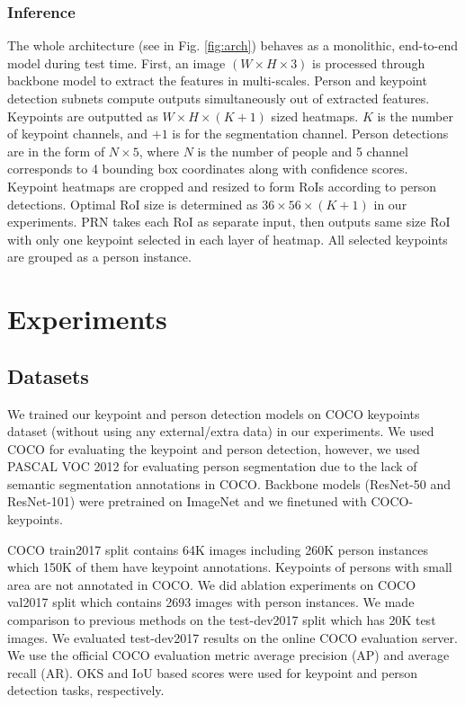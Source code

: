 \documentclass[runningheads]{llncs}
\begin{document}
\subsubsection{Inference}
The whole architecture (see in Fig. \ref{fig:arch}) behaves as  a monolithic, end-to-end model during test time. First, an image $(W \times H \times 3)$ is processed through backbone model to extract the features in multi-scales. Person and keypoint detection subnets compute outputs simultaneously out of extracted features. Keypoints are outputted as $W \times H \times (K+1)$ sized heatmaps. $K$ is the number of keypoint channels, and $+1$ is for the segmentation channel. Person detections are in the form of $N \times 5$, where $N$ is the number of people and 5 channel corresponds to 4 bounding box coordinates along with confidence scores. Keypoint heatmaps are cropped and resized to form RoIs according to person detections. Optimal RoI size is determined as $36 \times 56 \times (K+1)$ in our experiments. PRN takes each RoI as separate input, then outputs same size RoI with only one keypoint selected in each layer of heatmap. All selected keypoints are grouped as a person instance.




\section{Experiments}
\subsection{Datasets}
We trained our keypoint and person detection models on COCO keypoints dataset \cite{Lin2014} (without using any external/extra data) in our experiments. We used COCO for evaluating the keypoint and person detection, however, we used PASCAL VOC 2012\cite{Everingham15} for evaluating person segmentation due to the lack of semantic segmentation annotations in COCO. Backbone models (ResNet-50 and ResNet-101) were pretrained on ImageNet and we finetuned with COCO-keypoints.


COCO train2017 split contains 64K images including 260K person instances which 150K of them have keypoint annotations. Keypoints of persons with small area are not annotated in COCO. We did ablation experiments on COCO val2017 split which contains 2693 images with person instances. We made comparison to previous methods on the test-dev2017 split which has 20K test images. We evaluated test-dev2017 results on the online COCO evaluation server. We use the official COCO evaluation metric average precision (AP) and average recall (AR). OKS and IoU based scores were used for keypoint and person detection tasks, respectively.
\end{document}
